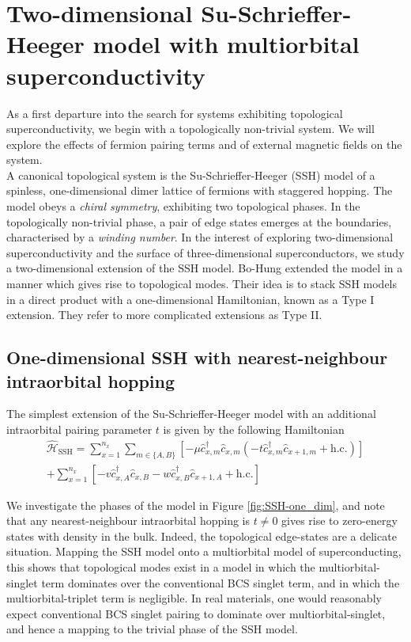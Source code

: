 \chapter{\label{ch:2D_SSH}Two-dimensional Su-Schrieffer-Heeger model with multiorbital superconductivity}
As a first departure into the search for systems exhibiting topological 
superconductivity, we begin with a topologically non-trivial system.
We will explore the effects of fermion pairing terms and of external 
magnetic fields on the system.\\
A canonical topological system is the Su-Schrieffer-Heeger (SSH) model of a 
spinless, one-dimensional dimer lattice of fermions with staggered hopping. 
The model obeys a {\it chiral symmetry}, exhibiting two topological phases. 
In the topologically non-trivial phase, a pair of edge states emerges at 
the boundaries, characterised by a {\it winding number}. 
In the interest of exploring two-dimensional superconductivity and the
surface of three-dimensional superconductors, we study a two-dimensional
extension of the SSH model. Bo-Hung extended the model in a manner which 
gives rise to topological modes. Their idea is to stack SSH models in a 
direct product with a one-dimensional Hamiltonian, known as a Type I 
extension. They refer to more complicated extensions as Type II.\\

\section{\label{sec:SSH} One-dimensional SSH with nearest-neighbour intraorbital hopping}
The simplest extension of the Su-Schrieffer-Heeger model with an additional
intraorbital pairing parameter $t$ is given by the following Hamiltonian
\begin{multline}
    \hat{\mathcal H}_\text{SSH} =  
    \sum_{x=1}^{n_x} \sum_{m\in\{A,B\}} 
    \left[
-\mu \hat c_{x, m}^\dagger \hat c_{x, m}
(-t \hat c_{x, m}^\dagger \hat c_{x+1, m} 
+\text{h.c.})
\right]\\
    +
    \sum_{x=1}^{n_x}
    \left[
    -v \hat c_{x, A}^\dagger \hat c_{x, B}
    -w \hat c_{x, B}^\dagger \hat c_{x+1, A}
    +\text{h.c.}
    \right]
\label{eq:one-dimensional_SSH}
\end{multline}

We investigate the phases of the model in Figure \ref{fig:SSH-one_dim}, and note 
that any nearest-neighbour intraorbital hopping is $t\neq0$ gives rise to 
zero-energy states with density in the bulk. Indeed, the topological edge-states
are a delicate situation. Mapping the SSH model onto a multiorbital model of
superconducting, this shows that topological modes exist in a model in which
the multiorbital-singlet term dominates over the conventional BCS singlet term,
and in which the multiorbital-triplet term is negligible. 
In real materials, one would reasonably expect conventional BCS singlet pairing 
to dominate over multiorbital-singlet, and hence a mapping to the trivial
phase of the SSH model.

